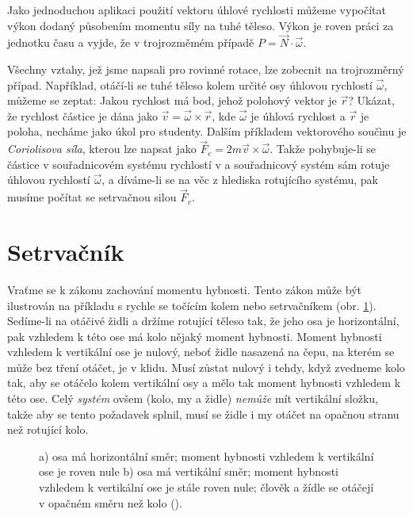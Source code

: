     Jako jednoduchou aplikaci použití vektoru úhlové rychlosti můžeme vypočítat výkon dodaný
    působením momentu síly na tuhé těleso. Výkon je roven práci za jednotku času a vyjde, že v
    trojrozměmém případě \(P=\vec{N}\cdot\vec{\omega}\).

    Všechny vztahy, jež jsme napsali pro rovinné rotace, lze zobecnit na trojrozměrný případ.
    Například, otáčí-li se tuhé těleso kolem určité osy úhlovou rychlostí \(\vec{\omega}\), můžeme
    se zeptat: Jakou rychlost má bod, jehož polohový vektor je \(\vec{r}\)? Ukázat, že rychlost
    částice je dána jako \(\vec{v} = \vec{\omega} \times \vec{r}\), kde \(\vec{\omega}\) je úhlová
    rychlost a \(\vec{r}\) je poloha, necháme jako úkol pro studenty. Dalším příkladem vektorového
    součìnu je \emph{Coriolisova síla}, kterou lze napsat jako \(\vec{F}_c =2m\vec{v} \times
    \vec{\omega}\). Takže pohybuje-li se částice v souřadnicovém systému rychlostí v a souřadnicový
    systém sám rotuje úhlovou rychlostí \(\vec{\omega}\), a díváme-li se na věc z hlediska
    rotujícího systému, pak musíme počítat se setrvačnou silou \(\vec{F}_c\).

  \section{Setrvačník}\label{fyz:IchapXXsecIII}
    Vraťme se k zákonu zachování momentu hybnosti. Tento zákon může být ilustrován na příkladu s
    rychle se točícím kolem nebo setrvačníkem (obr. \ref{fyz:fig406}). Sedíme-li na otáčivé židli a
    držíme rotující těleso tak, že jeho osa je horizontální, pak vzhledem k této ose má kolo nějaký
    moment hybnosti. Moment hybnosti vzhledem k vertikální ose je nulový, neboť židle nasazená na
    čepu, na kterém se může bez tření otáčet, je v klidu. Musí zůstat nulový i tehdy, když zvedneme
    kolo tak, aby se otáčelo kolem vertikální osy a mělo tak moment hybnosti vzhledem k této ose.
    Celý \emph{systém} ovšem (kolo, my a židle) \emph{nemůže} mít vertikální složku, takže aby se
    tento požadavek splnil, musí se židle i my otáčet na opačnou stranu než rotující kolo.

    \begin{figure}[ht!] %
      \centering
      \hspace{5em}
      \caption{a) osa má horizontální směr; moment hybnosti vzhledem k vertikální ose je roven nule 
              b) osa má vertikální směr; moment hybnosti vzhledem k vertikální ose je stále roven 
              nule; člověk a žídle se otáčejí v opačném směru než kolo
              (\cite[s.~278]{Feynman01}).}
      \label{fyz:fig406}
    \end{figure}

